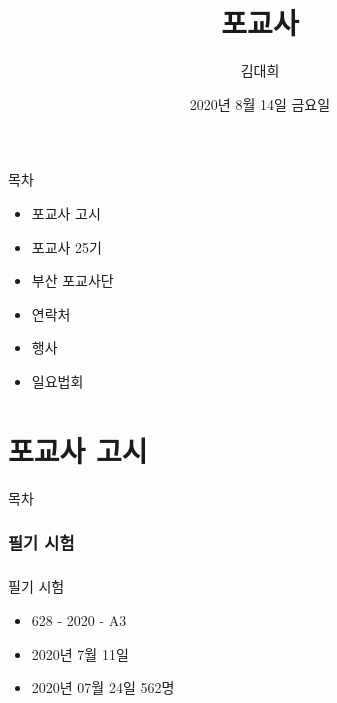 \documentclass[aspectratio=1610,14pt,xcolor=pdftex,dvipsnames,table,handout]{beamer}
\begin{document}
	

			\title{ 포교사  }
			\author{ 김대희 }
			\date{ 2020년 
					8월 
					14일 
					금요일   }


%
%
%
%


		\begin{frame}[plain]
		\titlepage
		\end{frame}


		\begin{frame} [plain]{목차}
		\tableofcontents%

			\begin{itemize}
				\item 포교사 고시
				\item 포교사 25기
				\item 부산 포교사단
				\item 연락처
				\item 행사
				\item 일요법회
			\end{itemize}

		\end{frame}



		\part{ 포교사 고시 }
		\frame{\partpage}

		\begin{frame} [plain]{목차}
		\tableofcontents%
		\end{frame}
		

		\section{ 필기 시험 }
		\begin{frame} [t,plain]
		\frametitle{}
			\begin{block} { 필기 시험}
			\setlength{\leftmargini}{5em}			
			\begin{itemize}
				\item [수험번호]628 - 2020 - A3
				\item [시험] 2020년 7월 11일
				\item [합격] 2020년 07월 24일 562명
			\end{itemize}
			\end{block}						
		\end{frame}						
		
\end{document}
